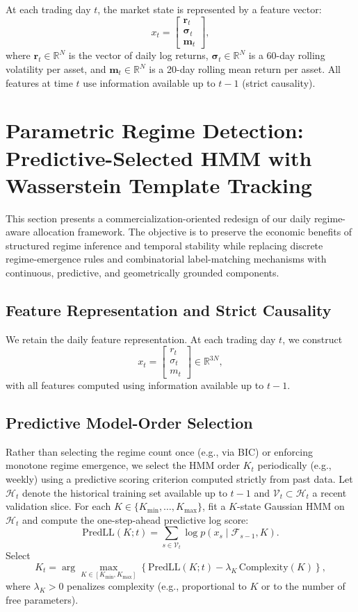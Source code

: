 \documentclass[11pt]{article}
\begin{document}
At each trading day $t$, the market state is represented by a feature vector:
\[
x_t =
\begin{bmatrix}
\mathbf{r}_t \\
\boldsymbol{\sigma}_t \\
\boldsymbol{m}_t
\end{bmatrix},
\]
where $\mathbf{r}_t \in \mathbb{R}^N$ is the vector of daily log returns,
$\boldsymbol{\sigma}_t \in \mathbb{R}^N$ is a 60-day rolling volatility per asset,
and $\boldsymbol{m}_t \in \mathbb{R}^N$ is a 20-day rolling mean return per asset.
All features at time $t$ use information available up to $t-1$ (strict causality).

\section{Parametric Regime Detection: Predictive-Selected HMM with Wasserstein Template Tracking}
\label{sec:parametric_regime}

This section presents a commercialization-oriented redesign of our daily regime-aware allocation framework.
The objective is to preserve the economic benefits of structured regime inference and temporal stability while replacing
discrete regime-emergence rules and combinatorial label-matching mechanisms with continuous, predictive, and geometrically grounded components.

\subsection{Feature Representation and Strict Causality}
We retain the daily feature representation. At each trading day $t$, we construct
\[
x_t = \begin{bmatrix} r_t \\ \sigma_t \\ m_t \end{bmatrix} \in \mathbb{R}^{3N},
\]
with all features computed using information available up to $t-1$.

\subsection{Predictive Model-Order Selection}

Rather than selecting the regime count once (e.g., via BIC) or enforcing monotone regime emergence,
we select the HMM order $K_t$ periodically (e.g., weekly) using a predictive scoring criterion computed strictly from past data.
Let $\mathcal{H}_t$ denote the historical training set available up to $t-1$ and $\mathcal{V}_t\subset \mathcal{H}_t$ a recent validation slice.
For each $K\in\{K_{\min},\dots,K_{\max}\}$, fit a $K$-state Gaussian HMM on $\mathcal{H}_t$ and compute the one-step-ahead predictive log score:
\[
\text{PredLL}(K;t)=\sum_{s\in\mathcal{V}_t} \log p(x_s \mid \mathcal{F}_{s-1}, K).
\]
Select
\[
K_t = \arg\max_{K\in[K_{\min},K_{\max}]} \left\{\text{PredLL}(K;t) - \lambda_K\,\text{Complexity}(K)\right\},
\]
where $\lambda_K>0$ penalizes complexity (e.g., proportional to $K$ or to the number of free parameters).
\end{document}
